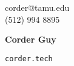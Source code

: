 \documentclass[12pt]{article}
\begin{document}

\noindent
\begin{minipage}{0.3\linewidth}
  \begin{flushleft}
    corder@tamu.edu\\
    (512) 994 8895\\
  \end{flushleft}
\end{minipage}
\hfill
\begin{minipage}{0.3\linewidth}
  \begin{center}
    {\Huge\textbf{Corder Guy}}
  \end{center}
\end{minipage}
\hfill
\begin{minipage}{0.3\linewidth}
  \begin{flushright}
    \verb|corder.tech|
  \end{flushright}
\end{minipage}

\end{document}
